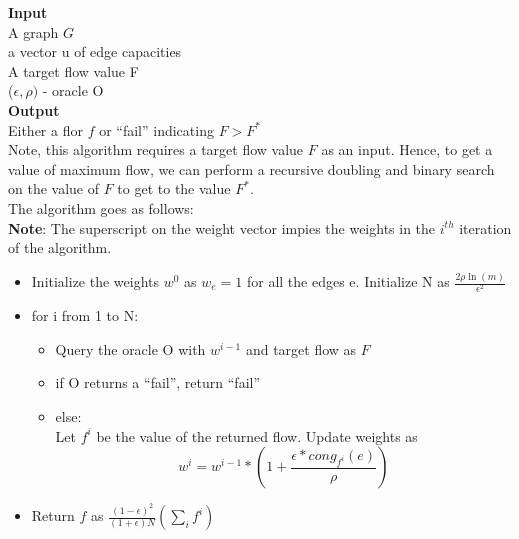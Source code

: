 \documentclass[a4paper,10pt]{article}
\newcommand{\eps}{\epsilon}
\begin{document}
	      \textbf{Input} \\
	      A graph $G$ \\
	      a vector u of edge capacities \\
	      A target flow value F \\
	      ($\eps, \rho)$ - oracle O \\
	      
	      \textbf{Output}\\
	      Either a flor $f$ or ``fail'' indicating $F > F^{\ast}$ \\
	      
	      Note, this algorithm requires a target flow value $F$ as an input. Hence, to get a value of maximum flow, we can perform a recursive
	      doubling and binary search on the value of $F$ to get to the value $F^{\ast}$. \\
	      
	      The algorithm goes as follows: \\
	      
	      \textbf{Note}: The superscript on the weight vector impies the weights in the $i^{th}$ iteration of the algorithm.
	      \begin{itemize}
	       \item 
		Initialize the weights $w^0$ as $w_e =1$ for all the edges e. Initialize N as $\frac{2\rho \ln(m)}{\eps^2}$
	      \item
		for i from 1 to N:
		  \begin{itemize}
		   \item 
		      Query the oracle O with $w^{i-1}$ and target flow as $F$
		   \item
		      if O returns a ``fail'', return ``fail''
		   \item
		      else: \\
		      	Let $f^i$ be the value of the returned flow. Update weights as
			 $$w^{i} = w^{i-1}\ast\left(1+\frac{\eps\ast cong_{f^i}(e)}{\rho}\right)$$
		  \end{itemize}

		\item
		  Return $f$ as $\frac{(1-\eps)^2}{(1+\eps)N}\left(\sum\limits_{i} f^i\right)$
	      \end{itemize}
\end{document}
